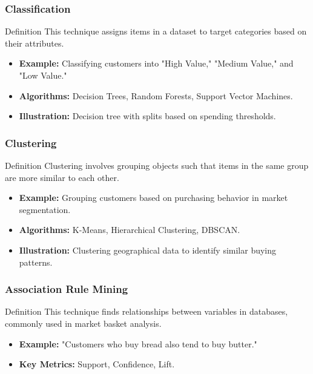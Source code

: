 \documentclass[aspectratio=169]{beamer}
\begin{document}
\begin{frame}[fragile]
    \frametitle{Classification}
    \begin{block}{Definition}
        This technique assigns items in a dataset to target categories based on their attributes.
    \end{block}
    \begin{itemize}
        \item \textbf{Example:} Classifying customers into "High Value," "Medium Value," and "Low Value."
        \item \textbf{Algorithms:} Decision Trees, Random Forests, Support Vector Machines.
        \item \textbf{Illustration:} Decision tree with splits based on spending thresholds.
    \end{itemize}
\end{frame}

\begin{frame}[fragile]
    \frametitle{Clustering}
    \begin{block}{Definition}
        Clustering involves grouping objects such that items in the same group are more similar to each other.
    \end{block}
    \begin{itemize}
        \item \textbf{Example:} Grouping customers based on purchasing behavior in market segmentation.
        \item \textbf{Algorithms:} K-Means, Hierarchical Clustering, DBSCAN.
        \item \textbf{Illustration:} Clustering geographical data to identify similar buying patterns.
    \end{itemize}
\end{frame}

\begin{frame}[fragile]
    \frametitle{Association Rule Mining}
    \begin{block}{Definition}
        This technique finds relationships between variables in databases, commonly used in market basket analysis.
    \end{block}
    \begin{itemize}
        \item \textbf{Example:} "Customers who buy bread also tend to buy butter."
        \item \textbf{Key Metrics:} Support, Confidence, Lift.
    \end{itemize}
\end{frame}
\end{document}
